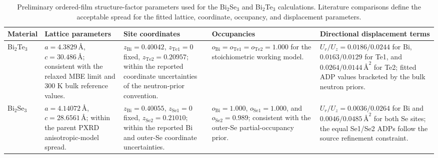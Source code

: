 \begin{table}[H]
  \centering
  \caption{Preliminary ordered-film structure-factor parameters used for the Bi$_2$Se$_3$ and Bi$_2$Te$_3$ calculations. Literature comparisons define the acceptable spread for the fitted lattice, coordinate, occupancy, and displacement parameters.}
  \label{tab:ordered_sf_parameters}
  \scriptsize
  \setlength{\tabcolsep}{3pt}
  \renewcommand{\arraystretch}{1.12}
  \begin{tabularx}{\linewidth}{@{}p{1.55cm} >{\raggedright\arraybackslash}X >{\raggedright\arraybackslash}X >{\raggedright\arraybackslash}X >{\raggedright\arraybackslash}X@{}}
    \toprule
    Material & Lattice parameters & Site coordinates & Occupancies & Directional displacement terms \\
    \midrule
    Bi$_2$Te$_3$ &
    $a=4.3829\,\text{\AA}$, $c=30.486\,\text{\AA}$; consistent with the relaxed MBE limit and 300 K bulk reference values.\cite{Mansour2014,Steiner2014} &
    $z_{\mathrm{Bi}}=0.40042$, $z_{\mathrm{Te1}}=0$ fixed, $z_{\mathrm{Te2}}=0.20957$; within the reported coordinate uncertainties of the neutron-prior convention.\cite{Mansour2014} &
    $o_{\mathrm{Bi}}=o_{\mathrm{Te1}}=o_{\mathrm{Te2}}=1.000$ for the stoichiometric working model.\cite{Steiner2014,Gharsallah2016} &
    $U_r/U_z=0.0186/0.0244$ for Bi, $0.0163/0.0129$ for Te1, and $0.0264/0.0144\,\text{\AA}^2$ for Te2; fitted ADP values bracketed by the bulk neutron priors.\cite{Mansour2014,Trueblood1996} \\
    Bi$_2$Se$_3$ &
    $a=4.14072\,\text{\AA}$, $c=28.6561\,\text{\AA}$; within the parent PXRD anisotropic-model spread.\cite{Callaert2019} &
    $z_{\mathrm{Bi}}=0.40055$, $z_{\mathrm{Se1}}=0$ fixed, $z_{\mathrm{Se2}}=0.21010$; within the reported Bi and outer-Se coordinate uncertainties.\cite{Callaert2019} &
    $o_{\mathrm{Bi}}=1.000$, $o_{\mathrm{Se1}}=1.000$, and $o_{\mathrm{Se2}}=0.989$; consistent with the outer-Se partial-occupancy prior.\cite{Callaert2019} &
    $U_r/U_z=0.0036/0.0264$ for Bi and $0.0046/0.0485\,\text{\AA}^2$ for both Se sites; the equal Se1/Se2 ADPs follow the source refinement constraint.\cite{Callaert2019,Trueblood1996} \\
    \bottomrule
  \end{tabularx}
\end{table}